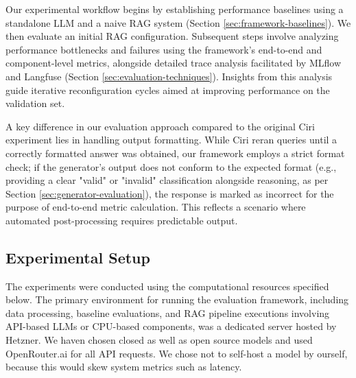 Our experimental workflow begins by establishing performance baselines using a standalone LLM and a naive RAG system (Section \ref{sec:framework-baselines}). We then evaluate an initial RAG configuration. Subsequent steps involve analyzing performance bottlenecks and failures using the framework's end-to-end and component-level metrics, alongside detailed trace analysis facilitated by MLflow and Langfuse (Section \ref{sec:evaluation-techniques}). Insights from this analysis guide iterative reconfiguration cycles aimed at improving performance on the validation set.

A key difference in our evaluation approach compared to the original Ciri experiment \cite{Lian.2024} lies in handling output formatting. While Ciri reran queries until a correctly formatted answer was obtained, our framework employs a strict format check; if the generator's output does not conform to the expected format (e.g., providing a clear "valid" or "invalid" classification alongside reasoning, as per Section \ref{sec:generator-evaluation}), the response is marked as incorrect for the purpose of end-to-end metric calculation. This reflects a scenario where automated post-processing requires predictable output.





\subsection{Experimental Setup} \label{sec:exp_setup}
The experiments were conducted using the computational resources specified below. The primary environment for running the evaluation framework, including data processing, baseline evaluations, and RAG pipeline executions involving API-based LLMs or CPU-based components, was a dedicated server hosted by Hetzner. We haven chosen closed as well as open source models and used OpenRouter.ai\cite{openrouter-inc-2023} for all API requests. We chose not to self-host a model by ourself, because this would skew system metrics such as latency.

